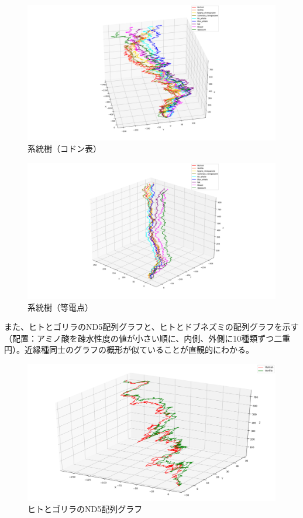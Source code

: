 \documentclass[a4paper,12pt]{jsreport}
\begin{document}
\begin{figure}[H]
\centering
\includegraphics[width=120mm]{pic_graph_codon.png}
\caption{系統樹（コドン表）}
\end{figure}

\begin{figure}[H]
\centering
\includegraphics[width=120mm]{pic_graph_iso.png}
\caption{系統樹（等電点）}
\end{figure}

また、ヒトとゴリラのND5配列グラフと、ヒトとドブネズミの配列グラフを示す（配置：アミノ酸を疎水性度の値が小さい順に、内側、外側に10種類ずつ二重円）。近縁種同士のグラフの概形が似ていることが直観的にわかる。

\begin{figure}[H]
\centering
\includegraphics[width=120mm]{pic05.png}
\caption{ヒトとゴリラのND5配列グラフ}
\end{figure}
\end{document}
